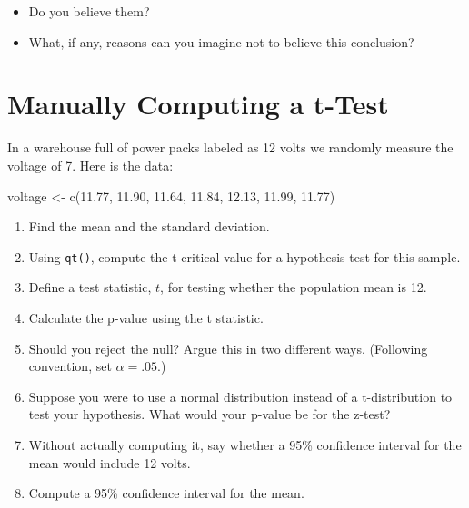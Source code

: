 \documentclass[
]{book}
\newenvironment{Shaded}{\begin{snugshade}}{\end{snugshade}}
\newcommand{\FloatTok}[1]{\textcolor[rgb]{0.00,0.00,0.81}{#1}}
\newcommand{\FunctionTok}[1]{\textcolor[rgb]{0.00,0.00,0.00}{#1}}
\newcommand{\NormalTok}[1]{#1}
\newcommand{\OtherTok}[1]{\textcolor[rgb]{0.56,0.35,0.01}{#1}}
\providecommand{\tightlist}{%
  \setlength{\itemsep}{0pt}\setlength{\parskip}{0pt}}
\theoremstyle{definition}
\theoremstyle{definition}
\theoremstyle{definition}
\theoremstyle{definition}
\theoremstyle{remark}
\begin{document}
\begin{itemize}
\tightlist
\item
  Do you believe them?
\item
  What, if any, reasons can you imagine not to believe this conclusion?
\end{itemize}

\hypertarget{manually-computing-a-t-test}{%
\section{Manually Computing a t-Test}\label{manually-computing-a-t-test}}

In a warehouse full of power packs labeled as 12 volts we randomly measure the voltage of 7. Here is the data:

\begin{Shaded}
\begin{Highlighting}[]
\NormalTok{voltage }\OtherTok{\textless{}{-}} \FunctionTok{c}\NormalTok{(}\FloatTok{11.77}\NormalTok{, }\FloatTok{11.90}\NormalTok{, }\FloatTok{11.64}\NormalTok{, }\FloatTok{11.84}\NormalTok{, }\FloatTok{12.13}\NormalTok{, }\FloatTok{11.99}\NormalTok{,  }\FloatTok{11.77}\NormalTok{)}
\end{Highlighting}
\end{Shaded}

\begin{enumerate}
\def\labelenumi{\arabic{enumi}.}
\item
  Find the mean and the standard deviation.
\item
  Using \texttt{qt()}, compute the t critical value for a hypothesis test for this sample.
\item
  Define a test statistic, \(t\), for testing whether the population mean is 12.
\item
  Calculate the p-value using the t statistic.
\item
  Should you reject the null? Argue this in two different ways. (Following convention, set \(\alpha = .05\).)
\item
  Suppose you were to use a normal distribution instead of a t-distribution to test your hypothesis. What would your p-value be for the z-test?
\item
  Without actually computing it, say whether a 95\% confidence interval for the mean would include 12 volts.
\item
  Compute a 95\% confidence interval for the mean.
\end{enumerate}
\end{document}
